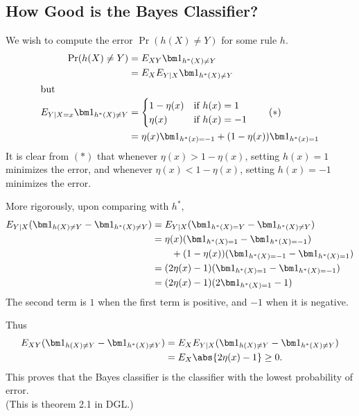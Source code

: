 \subsection{How Good is the Bayes Classifier?} \label{sec:bayest}
We wish to compute the error $\Pr(h(X) \ne Y)$ for some rule $h$.
\begin{align*}
    \Pr(h(X) \ne Y)
        &= E_{XY} \ind{h^*(X) \ne Y} \\
        &= E_X E_{Y \mid X} \ind{h^*(X) \ne Y} \\
    \intertext{but}
    E_{Y \mid X = x} \ind{h^*(X) \ne Y}
        &= \begin{cases}
            1 - \eta(x) & \text{if } h(x) = 1 \\
            \eta(x) & \text{if } h(x) = -1
        \end{cases} \tag{$*$} \\
        &= \eta(x) \ind{h^*(x) = -1} + (1 - \eta(x)) \ind{h^*(x) = 1}
\end{align*}
It is clear from $(*)$ that whenever $\eta(x) > 1 - \eta(x)$, setting
$h(x) = 1$ minimizes the error, and whenever $\eta(x) < 1 - \eta(x)$,
setting $h(x) = -1$ minimizes the error.

More rigorously, upon comparing with $h^*$,
\begin{align*}
    E_{Y \mid X} (\ind{h(X) \ne Y} - \ind{h^*(X) \ne Y})
        &= E_{Y \given X} (\ind{h^*(X) = Y} - \ind{h^*(X) \ne Y}) \\
        &= \eta(x) (\ind{h^*(X) = 1} - \ind{h^*(X) = -1}) \\
        &\qquad + (1 - \eta(x)) (\ind{h^*(X) = -1} - \ind{h^*(X) = 1}) \\
        &= (2 \eta(x) - 1)(\ind{h^*(X) = 1} - \ind{h^*(X) = -1}) \\
        &= (2 \eta(x) - 1)(2 \ind{h^*(X) = 1} - 1)
\end{align*}
The second term is $1$ when the first term is positive, and $-1$ when it is
negative.

Thus \begin{align*}
    E_{XY} (\ind{h(X) \ne Y} - \ind{h^*(X) \ne Y})
        &= E_X E_{Y \mid X} (\ind{h(X) \ne Y} - \ind{h^*(X) \ne Y}) \\
        &= E_X \abs{2 \eta(x) - 1} \ge 0.
\end{align*}
This proves that the Bayes classifier is the classifier with the lowest
probability of error. \\
(This is theorem 2.1 in DGL.)
